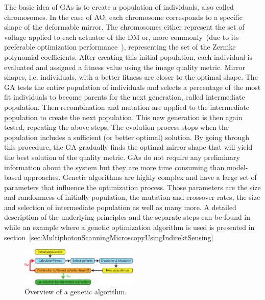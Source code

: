 The basic idea of GAs is to create a population of individuals, also called chromosomes. In the case of AO, each chromosome corresponds to a specific shape of the deformable mirror. The chromosomes either represent the set of voltage applied to each actuator of the DM or, more commonly~(due to its preferable optimization performance~\cite{Genetic_smart_algorithm}), representing the set of the Zernike polynomial coefficients. After creating this initial population, each individual is evaluated and assigned a fitness value using the image quality metric. Mirror shapes, i.e. individuals, with a better fitness are closer to the optimal shape. The GA tests the entire population of individuals and selects a percentage of the most fit individuals to become parents for the next generation, called intermediate population. Then recombination and mutation are applied to the intermediate population to create the next population. This new generation is then again tested, repeating the above steps. The evolution process stops when the population includes a sufficient (or better optimal) solution. By going through this procedure, the GA gradually finds the optimal mirror shape that will yield the best solution of the quality metric. GAs do not require any preliminary information about the system but they are more time consuming than model-based approaches. Genetic algorithms are highly complex and have a large set of parameters  that influence the optimization process. Those parameters are the size and randomness of initially population, the mutation and crossover rates, the size and selection of intermediate population as well as many more. A detailed description of the underlying principles and the separate steps can be found in~\cite{Genetic_tutorial} while an example where a genetic optimization algorithm is used is presented in section~\ref{sec:MultiphotonScanningMicroscopyUsingIndirektSensing}

\begin{figure}[htbp]
	\centering
		\includegraphics[width=0.50\textwidth]{images/genetic_algorithm_overview.pdf}
	\caption{Overview of a genetic algorithm. }
	\label{fig:genetic_algorithm_overview}
\end{figure}


